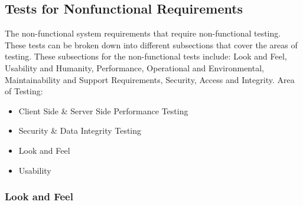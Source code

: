 \documentclass[12pt, titlepage]{article}
\begin{document}
\subsection{Tests for Nonfunctional Requirements}
\label{s5.2}



The non-functional system requirements that require non-functional testing. These tests can be broken down into different subsections that cover the areas of testing. These subsections for the non-functional tests include: Look and Feel, Usability and Humanity, Performance, Operational and Environmental, Maintainability and Support Requirements, Security, Access and Integrity.
Area of Testing:
\begin{itemize}
    \item Client Side \& Server Side Performance Testing
    \item Security \& Data Integrity Testing
    \item Look and Feel 
    \item Usability
\end{itemize}


\subsubsection{Look and Feel}
\end{document}
